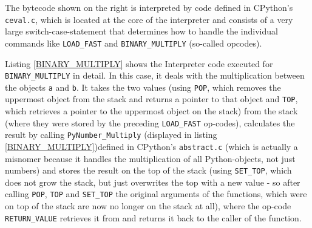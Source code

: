 \documentclass[english,11pt,a4paper,table]{article} %
\begin{document}


The bytecode shown on the right is interpreted by code defined in CPython's \texttt{ceval.c},
which is located at the core of the interpreter and consists of a very large switch-case-statement that determines how to handle the individual commands like \texttt{LOAD\_FAST} and \texttt{BINARY\_MULTIPLY} (so-called opcodes). \cite{ceval}

Listing \ref{BINARY_MULTIPLY} shows the Interpreter code executed for \texttt{BINARY\_MULTIPLY} in detail. In this case, it deals with the multiplication between the objects \texttt{a} and \texttt{b}.
It takes the two values (using \texttt{POP}, which removes the uppermost object from the stack and returns a pointer to that object and \texttt{TOP}, which retrieves a pointer to the uppermost object on the stack) from the stack (where they were stored by the preceding \texttt{LOAD\_FAST} op-codes), calculates the result by calling \texttt{PyNumber\_Multiply} (displayed in listing \ref{BINARY_MULTIPLY})defined in CPython's \texttt{abstract.c} (which is actually a misnomer because it handles the multiplication of all Python-objects, not just numbers) and stores the result on the top of the stack (using \texttt{SET\_TOP}, which does not grow the stack, but just overwrites the top with a new value - so after calling \texttt{POP}, \texttt{TOP} and \texttt{SET\_TOP} the original arguments of the functions, which were on top of the stack are now no longer on the stack at all), where the op-code \texttt{RETURN\_VALUE} retrieves it from and returns it back to the caller of the function.
\end{document}
